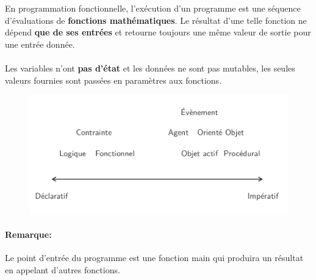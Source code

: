 \item{}
{\faux}
{En programmation fonctionnelle, l'exécution d'un programme est une séquence d'évaluations de \textbf{fonctions mathématiques}. Le résultat d'une telle fonction ne dépend \textbf{que de ses entrées} et retourne toujours une même valeur de sortie pour une entrée donnée.
\paragraph{}
Les variables n'ont \textbf{pas d'état} et les données ne sont pas mutables, les seules valeurs fournies sont passées en paramètres aux fonctions.
\begin{figure}[h!]
\center\includegraphics[scale=.3]{images/vue-paradigmes}
\end{figure}
\paragraph{Remarque: }
Le point d'entrée du programme est une fonction main qui produira un résultat en appelant d'autres fonctions.
}


\item{}
{\vrai}
{}